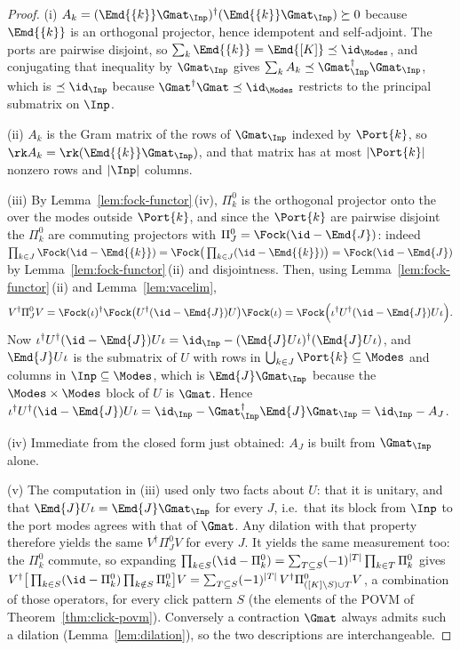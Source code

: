 \begin{proof}
(i) $A_k=(\Emd{\{k\}}\Gmat_{\Inp})^\dagger(\Emd{\{k\}}\Gmat_{\Inp})\succeq0$
because $\Emd{\{k\}}$ is an orthogonal projector, hence idempotent and
self-adjoint. The ports are pairwise disjoint, so
$\sum_k\Emd{\{k\}}=\Emd{[K]}\preceq\id_{\Modes}$, and conjugating that
inequality by $\Gmat_{\Inp}$ gives
$\sum_kA_k\preceq\Gmat_{\Inp}^\dagger\Gmat_{\Inp}$, which is
$\preceq\id_{\Inp}$ because $\Gmat^\dagger\Gmat\preceq\id_{\Modes}$ restricts
to the principal submatrix on $\Inp$.

(ii) $A_k$ is the Gram matrix of the rows of $\Gmat_{\Inp}$ indexed by
$\Port{k}$, so $\rk A_k=\rk(\Emd{\{k\}}\Gmat_{\Inp})$, and that matrix has at
most $|\Port{k}|$ nonzero rows and $|\Inp|$ columns.

(iii) By Lemma~\ref{lem:fock-functor}\,(iv), $\Pi^0_k$ is the orthogonal projector
onto the  over the modes outside $\Port{k}$, and since the
$\Port{k}$ are pairwise disjoint the $\Pi^0_k$ are commuting projectors with
$\Pi^0_J=\Fock(\id-\Emd{J})$: indeed
$\prod_{k\in J}\Fock(\id-\Emd{\{k\}})=\Fock\big(\prod_{k\in
J}(\id-\Emd{\{k\}})\big)=\Fock(\id-\Emd{J})$ by
Lemma~\ref{lem:fock-functor}\,(ii) and disjointness. Then, using
Lemma~\ref{lem:fock-functor}\,(ii) and Lemma~\ref{lem:vacelim},
\begin{equation}
  V^\dagger\Pi^0_JV
  =\Fock(\iota)^\dagger\Fock\big(U^\dagger(\id-\Emd{J})U\big)\Fock(\iota)
  =\Fock\Big(\iota^\dagger U^\dagger(\id-\Emd{J})U\iota\Big).
\end{equation}
Now $\iota^\dagger U^\dagger(\id-\Emd{J})U\iota
=\id_{\Inp}-(\Emd{J}U\iota)^\dagger(\Emd{J}U\iota)$, and $\Emd{J}U\iota$ is the
submatrix of $U$ with rows in $\bigcup_{k\in J}\Port{k}\subseteq\Modes$ and
columns in $\Inp\subseteq\Modes$, which is $\Emd{J}\Gmat_{\Inp}$ because the
$\Modes\times\Modes$ block of $U$ is $\Gmat$. Hence
$\iota^\dagger U^\dagger(\id-\Emd{J})U\iota=\id_{\Inp}-\Gmat_{\Inp}^\dagger
\Emd{J}\Gmat_{\Inp}=\id_{\Inp}-A_J$.

(iv) Immediate from the closed form just obtained: $A_J$ is built from
$\Gmat_{\Inp}$ alone.

(v) The computation in (iii) used only two facts about $U$: that it is unitary,
and that $\Emd{J}U\iota=\Emd{J}\Gmat_{\Inp}$ for every $J$, i.e.\ that its
block from $\Inp$ to the port modes agrees with that of $\Gmat$. Any dilation
with that property therefore yields the same $V^\dagger\Pi^0_JV$ for every
$J$. It yields the same measurement too: the $\Pi^0_k$ commute, so expanding
$\prod_{k\in S}(\id-\Pi^0_k)=\sum_{T\subseteq S}(-1)^{|T|}\prod_{k\in T}\Pi^0_k$
gives
$V^\dagger\big[\prod_{k\in S}(\id-\Pi^0_k)\prod_{k\notin S}\Pi^0_k\big]V
=\sum_{T\subseteq S}(-1)^{|T|}\,V^\dagger\Pi^0_{([K]\setminus S)\cup T}V$,
a combination of those operators, for every click pattern $S$ (the elements of
the POVM of Theorem~\ref{thm:click-povm}). Conversely a contraction $\Gmat$ always
admits such a dilation (Lemma~\ref{lem:dilation}), so the two descriptions are
interchangeable.
\end{proof}
